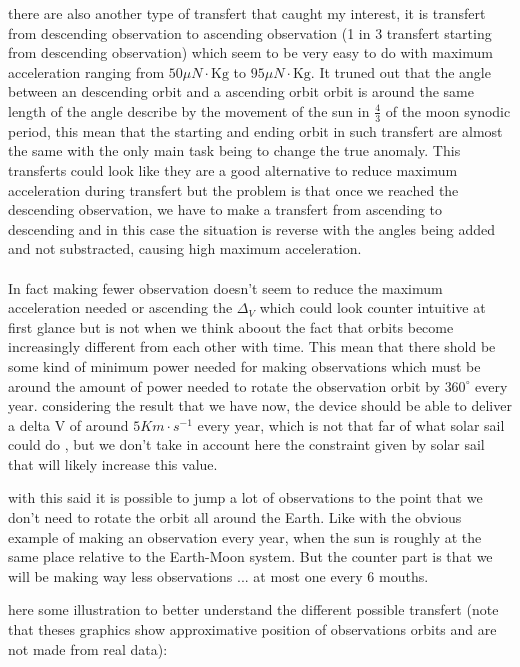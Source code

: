 \documentclass[11pt]{article} %
\begin{document}
			there are also another type of transfert that caught my interest, it is transfert from descending observation to ascending observation (1 in 3 transfert starting from descending observation) which seem to be very easy to do with maximum acceleration ranging from  $50 \mu{N}\cdot\text{Kg}$ to $95 \mu{N}\cdot\text{Kg}$. It truned out that the angle between an descending orbit and a ascending orbit orbit is around the same length of the angle describe by the movement of the sun in $\frac{4}{3}$ of the moon synodic period, this mean that the starting and ending orbit in such transfert are almost the same with the only main task being to change the true anomaly. This transferts could look like they are a good alternative to reduce maximum acceleration during transfert but the problem is that once we reached the descending observation, we have to make a transfert from ascending to descending and in this case the situation is reverse with the angles being added and not substracted, causing high maximum acceleration.
			\\ \\
			In fact making fewer observation doesn't seem to reduce the maximum acceleration needed or ascending the $\Delta_{V}$ which could look counter intuitive at first glance but is not when we think aboout the fact that orbits become increasingly different from each other with time. This mean that there shold be some kind of minimum power needed for making observations which must be around the amount of power needed to rotate the observation orbit by $360^\circ$ every year. considering the result that we have now, the device should be able to deliver a delta V of around $5Km\cdot s^{-1} $ every year, which is not that far of what solar sail could do , but we don't take in account here the constraint given by solar sail that will likely increase this value.
			
			
			
			 with this said it is possible to jump a lot of observations to the point that we don't need to rotate the orbit all around the Earth. Like with the obvious example of making an observation every year, when the sun is roughly at the same place relative to the Earth-Moon system. But the counter part is that we will be making way less observations ... at most one every 6 mouths. 
			
			here some illustration to better understand the different possible transfert (note that theses graphics show approximative position of observations orbits and are not made from real data):
			
\end{document}

